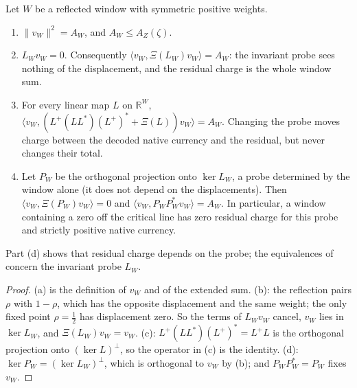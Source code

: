 \documentclass[11pt]{article}
\newcommand{\AZ}{A_{Z}(\zeta)}
\theoremstyle{definition}
\begin{document}
\begin{proposition}
\label{prop:rh:window-identities}
Let \(W\) be a reflected window with symmetric positive weights.
\begin{enumerate}[label=\textup{(\alph*)}]
  \item \(\|v_W\|^2=A_W\), and \(A_W\leq\AZ\).
  \item \(L_Wv_W=0\).  Consequently
    \(\langle v_W,\Xi(L_W)v_W\rangle=A_W\): the invariant probe sees
    nothing of the displacement, and the residual charge is the whole
    window sum.
  \item For every linear map \(L\) on \(\mathbb R^W\),
    \(\langle v_W,(L^+(LL^*)(L^+)^*+\Xi(L))v_W\rangle=A_W\).  Changing the
    probe moves charge between the decoded native currency and the
    residual, but never changes their total.
  \item Let \(P_W\) be the orthogonal projection onto \(\ker L_W\), a probe
    determined by the window alone (it does not depend on the
    displacements).  Then
    \(\langle v_W,\Xi(P_W)v_W\rangle=0\) and
    \(\langle v_W,P_WP_W^*v_W\rangle=A_W\).  In particular, a window
    containing a zero off the critical line has zero residual charge for this probe and strictly positive native currency.
\end{enumerate}
Part (d) shows that residual charge depends on the probe; the
equivalences of  concern the
invariant probe \(L_W\).
\end{proposition}

\begin{proof}
(a) is the definition of \(v_W\) and of the extended sum.  (b): the
reflection pairs \(\rho\) with \(1-\rho\), which has the opposite
displacement and the same weight; the only fixed point \(\rho=\frac12\)
has displacement zero.  So the terms of \(L_Wv_W\) cancel, \(v_W\) lies in
\(\ker L_W\), and \(\Xi(L_W)v_W=v_W\).  (c): \(L^+(LL^*)(L^+)^*=L^+L\) is
the orthogonal projection onto \((\ker L)^\perp\), so the operator in
(c) is the identity.  (d): \(\ker P_W=(\ker L_W)^\perp\), which is
orthogonal to \(v_W\) by (b); and \(P_WP_W^*=P_W\) fixes \(v_W\).
\end{proof}
\end{document}
